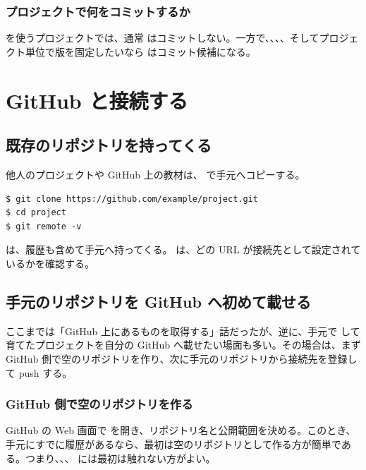 \subsubsection{ プロジェクトで何をコミットするか}

 を使うプロジェクトでは、通常  はコミットしない。一方で、、、、そしてプロジェクト単位で版を固定したいなら  はコミット候補になる。

\section{GitHub と接続する}

\subsection{既存のリポジトリを持ってくる}

他人のプロジェクトや GitHub 上の教材は、 で手元へコピーする。

\begin{lstlisting}[numbers=none, xleftmargin=2\zw]
$ git clone https://github.com/example/project.git
$ cd project
$ git remote -v
\end{lstlisting}

 は、履歴も含めて手元へ持ってくる。 は、どの URL が接続先として設定されているかを確認する。

\subsection{手元のリポジトリを GitHub へ初めて載せる}

ここまでは「GitHub 上にあるものを取得する」話だったが、逆に、手元で  して育てたプロジェクトを自分の GitHub へ載せたい場面も多い。その場合は、まず GitHub 側で空のリポジトリを作り、次に手元のリポジトリから接続先を登録して push する。

\subsubsection{GitHub 側で空のリポジトリを作る}

GitHub の Web 画面で  を開き、リポジトリ名と公開範囲を決める。このとき、手元にすでに履歴があるなら、最初は空のリポジトリとして作る方が簡単である。つまり、、、 には最初は触れない方がよい。

